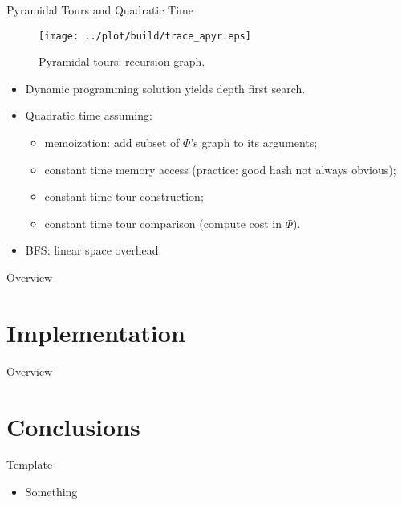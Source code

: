 \documentclass[
  size=10pt,
  style=klope,
  paper=screen,
  pauseslide,
  nopagebreaks,
  fleqn
]{powerdot}
\begin{document}
\begin{slide}{Pyramidal Tours and Quadratic Time}
  \begin{figure}[H]
    \centering
    \texttt{[image: ../plot/build/trace\_apyr.eps]}
    \caption{Pyramidal tours: recursion graph.}
  \end{figure}
  \begin{itemize}
  \item
  Dynamic programming solution yields depth first search.
  \item
  Quadratic time assuming:
  \begin{itemize}
    \item memoization: add subset of $\Phi$'s graph to its arguments;
    \item constant time memory access (practice: good hash not always obvious);
    \item constant time tour construction;
    \item constant time tour comparison (compute cost in $\Phi$).
  \end{itemize}
  \item
  BFS: linear space overhead.
  \begin{equation}
  \end{equation}
  \end{itemize}
\end{slide}

\begin{slide}[toc=,bm=]{Overview}
\tableofcontents[content=currentsection,type=1]
\end{slide}

\section[template=wideslide]{Implementation}

\begin{slide}[toc=,bm=]{Overview}
\tableofcontents[content=currentsection,type=1]
\end{slide}

\section[template=wideslide]{Conclusions}

\begin{slide}{Template}
  \begin{itemize}
  \item
  Something
  \begin{equation}
  \end{equation}
  \end{itemize}
\end{slide}
\end{document}
